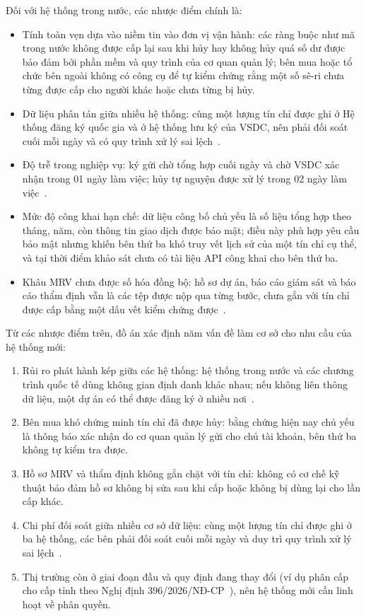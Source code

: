 Đối với hệ thống trong nước, các nhược điểm chính là:
\begin{itemize}
    \item Tính toàn vẹn dựa vào niềm tin vào đơn vị vận hành: các ràng buộc như mã trong nước không được cấp lại sau khi hủy hay không hủy quá số dư được bảo đảm bởi phần mềm và quy trình của cơ quan quản lý; bên mua hoặc tổ chức bên ngoài không có công cụ để tự kiểm chứng rằng một số sê-ri chưa từng được cấp cho người khác hoặc chưa từng bị hủy.
    \item Dữ liệu phân tán giữa nhiều hệ thống: cùng một lượng tín chỉ được ghi ở Hệ thống đăng ký quốc gia và ở hệ thống lưu ký của VSDC, nên phải đối soát cuối mỗi ngày và có quy trình xử lý sai lệch~\cite{vietnam2026thongtu11}.
    \item Độ trễ trong nghiệp vụ: ký gửi chờ tổng hợp cuối ngày và chờ VSDC xác nhận trong 01 ngày làm việc; hủy tự nguyện được xử lý trong 02 ngày làm việc~\cite{vietnam2026thongtu11}.
    \item Mức độ công khai hạn chế: dữ liệu công bố chủ yếu là số liệu tổng hợp theo tháng, năm, còn thông tin giao dịch được bảo mật; điều này phù hợp yêu cầu bảo mật nhưng khiến bên thứ ba khó truy vết lịch sử của một tín chỉ cụ thể, và tại thời điểm khảo sát chưa có tài liệu API công khai cho bên thứ ba.
    \item Khâu MRV chưa được số hóa đồng bộ: hồ sơ dự án, báo cáo giám sát và báo cáo thẩm định vẫn là các tệp được nộp qua từng bước, chưa gắn với tín chỉ được cấp bằng một dấu vết kiểm chứng được~\cite{mae2026tthc1014133}.
\end{itemize}

Từ các nhược điểm trên, đồ án xác định năm vấn đề làm cơ sở cho nhu cầu của hệ thống mới:
\begin{enumerate}[label=VĐ-\arabic*., leftmargin=1.6cm]
    \item Rủi ro phát hành kép giữa các hệ thống: hệ thống trong nước và các chương trình quốc tế dùng không gian định danh khác nhau; nếu không liên thông dữ liệu, một dự án có thể được đăng ký ở nhiều nơi~\cite{schneider2019double}.
    \item Bên mua khó chứng minh tín chỉ đã được hủy: bằng chứng hiện nay chủ yếu là thông báo xác nhận do cơ quan quản lý gửi cho chủ tài khoản, bên thứ ba không tự kiểm tra được.
    \item Hồ sơ MRV và thẩm định không gắn chặt với tín chỉ: không có cơ chế kỹ thuật bảo đảm hồ sơ không bị sửa sau khi cấp hoặc không bị dùng lại cho lần cấp khác.
    \item Chi phí đối soát giữa nhiều cơ sở dữ liệu: cùng một lượng tín chỉ được ghi ở ba hệ thống, các bên phải đối soát cuối mỗi ngày và duy trì quy trình xử lý sai lệch~\cite{vietnam2026thongtu11}.
    \item Thị trường còn ở giai đoạn đầu và quy định đang thay đổi (ví dụ phân cấp cho cấp tỉnh theo Nghị định 396/2026/NĐ-CP~\cite{vietnam2026nghidinh396}), nên hệ thống mới cần linh hoạt về phân quyền.
\end{enumerate}

